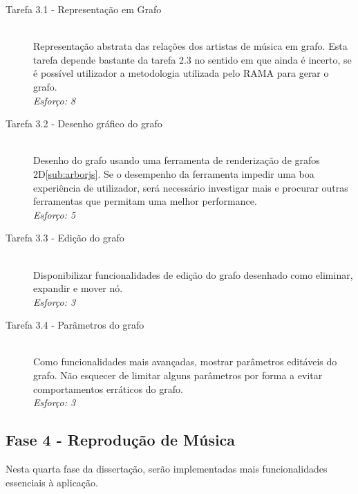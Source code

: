     \begin{description}
      \item[Tarefa 3.1 - Representação em Grafo] \hfill \\
      Representação abstrata das relações dos artistas de música em grafo.
      Esta tarefa depende bastante da tarefa 2.3 no sentido em que ainda é incerto, se é possível utilizador a metodologia utilizada pelo RAMA para gerar o grafo. \\
      \emph{Esforço: 8}

      \item[Tarefa 3.2 - Desenho gráfico do grafo] \hfill \\
      Desenho do grafo usando uma ferramenta de renderização de grafos 2D\ref{sub:arborjs}.
      Se o desempenho da ferramenta impedir uma boa experiência de utilizador, será necessário investigar mais e procurar outras ferramentas que permitam uma melhor performance. \\
      \emph{Esforço: 5}

      \item[Tarefa 3.3 - Edição do grafo] \hfill \\
      Disponibilizar funcionalidades de edição do grafo desenhado como eliminar, expandir e mover nó. \\
      \emph{Esforço: 3}

      \item[Tarefa 3.4 - Parâmetros do grafo] \hfill \\
      Como funcionalidades mais avançadas, mostrar parâmetros editáveis do grafo.
      Não esquecer de limitar alguns parâmetros por forma a evitar comportamentos erráticos do grafo.\\
      \emph{Esforço: 3}

    \end{description}


  \subsection{Fase 4 - Reprodução de Música} %
  \label{sub:dev_playlists}
  
    Nesta quarta fase da dissertação, serão implementadas mais funcionalidades essenciais à aplicação.

